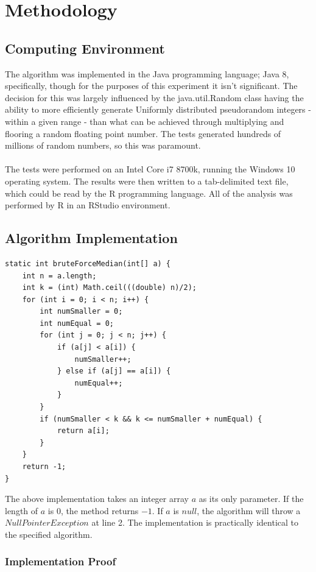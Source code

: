 \documentclass{article}
\begin{document}
\pagebreak
\section{Methodology}
\subsection{Computing Environment}
The algorithm was implemented in the Java programming language; Java 8, specifically, though for the purposes of this experiment it isn't significant. The decision for this was largely influenced by the java.util.Random class having the ability to more efficiently generate Uniformly distributed pseudorandom integers - within a given range - than what can be achieved through multiplying and flooring a random floating point number. The tests generated hundreds of millions of random numbers, so this was paramount.\\
\\
The tests were performed on an Intel Core i7 8700k, running the Windows 10 operating system. The results were then written to a tab-delimited text file, which could be read by the R programming language. All of the analysis was performed by R in an RStudio environment.

\subsection{Algorithm Implementation}
\begin{lstlisting}
static int bruteForceMedian(int[] a) {
	int n = a.length;
	int k = (int) Math.ceil(((double) n)/2);
	for (int i = 0; i < n; i++) {
		int numSmaller = 0;
		int numEqual = 0;
		for (int j = 0; j < n; j++) {
			if (a[j] < a[i]) {
				numSmaller++;
			} else if (a[j] == a[i]) {
				numEqual++;
			}
		}
		if (numSmaller < k && k <= numSmaller + numEqual) {
			return a[i];
		}
	}
	return -1;
}
\end{lstlisting}
The above implementation takes an integer array $a$ as its only parameter. If the length of $a$ is $0$, the method returns $-1$. If $a$ is $null$, the algorithm will throw a $NullPointerException$ at line 2. The implementation is practically identical to the specified algorithm.

\subsubsection{Implementation Proof}
\end{document}
